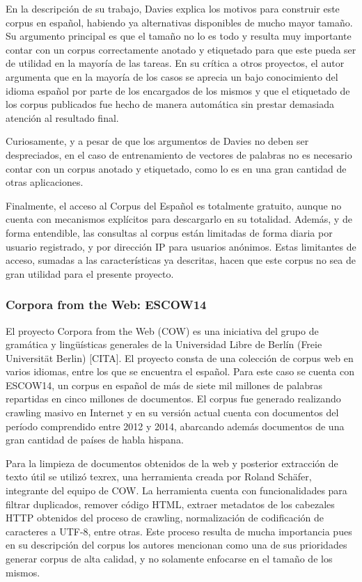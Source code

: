 En la descripción de su trabajo, Davies explica los motivos para construir este corpus en español,
habiendo ya alternativas disponibles de mucho mayor tamaño. Su argumento principal es que el tamaño
no lo es todo y resulta muy importante contar con un corpus correctamente anotado y etiquetado para
que este pueda ser de utilidad en la mayoría de las tareas. En su crítica a otros proyectos, el autor
argumenta que en la mayoría de los casos se aprecia un bajo conocimiento del idioma español por parte
de los encargados de los mismos y que el etiquetado de los corpus publicados fue hecho de manera
automática sin prestar demasiada atención al resultado final.

Curiosamente, y a pesar de que los argumentos de Davies no deben ser despreciados, en el caso de
entrenamiento de vectores de palabras no es necesario contar con un corpus anotado y etiquetado, como
lo es en una gran cantidad de otras aplicaciones.

Finalmente, el acceso al Corpus del Español es totalmente gratuito, aunque no cuenta con mecanismos
explícitos para descargarlo en su totalidad. Además, y de forma entendible, las consultas al corpus
están limitadas de forma diaria por usuario registrado, y por dirección IP para usuarios anónimos.
Estas limitantes de acceso, sumadas a las características ya descritas, hacen que este corpus no sea
de gran utilidad para el presente proyecto.

\subsubsection{Corpora from the Web: ESCOW14}

El proyecto Corpora from the Web (COW) es una iniciativa del grupo de gramática y lingüísticas
generales de la Universidad Libre de Berlín (Freie Universität Berlin) [CITA]. El proyecto consta
de una colección de corpus web en varios idiomas, entre los que se encuentra el español. Para este
caso se cuenta con ESCOW14, un corpus en español de más de siete mil millones de palabras repartidas
en cinco millones de documentos. El corpus fue generado realizando crawling masivo en Internet y en
su versión actual cuenta con documentos del período comprendido entre 2012 y 2014, abarcando además
documentos de una gran cantidad de países de habla hispana.

Para la limpieza de documentos obtenidos de la web y posterior extracción de texto útil se utilizó
texrex, una herramienta creada por Roland Schäfer, integrante del equipo de COW. La herramienta cuenta
con funcionalidades para filtrar duplicados, remover código HTML, extraer metadatos de los cabezales
HTTP obtenidos del proceso de crawling, normalización de codificación de caracteres a UTF-8, entre
otras. Este proceso resulta de mucha importancia pues en su descripción del corpus los autores
mencionan como una de sus prioridades generar corpus de alta calidad, y no solamente enfocarse en el
tamaño de los mismos.

